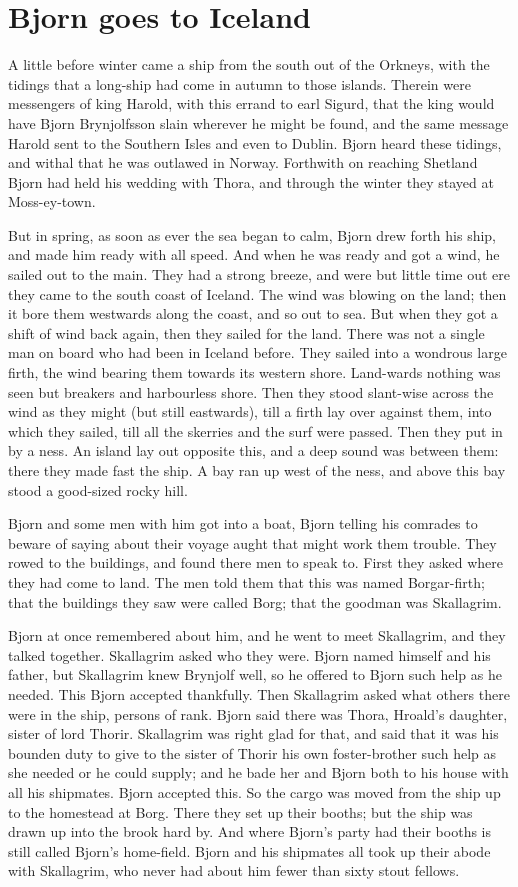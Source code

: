 \chapter{Bjorn goes to Iceland}
A little before winter came a ship from the south out of the Orkneys, with the tidings that a long-ship had come in autumn to those islands. Therein were messengers of king Harold, with this errand to earl Sigurd, that the king would have Bjorn Brynjolfsson slain wherever he might be found, and the same message Harold sent to the Southern Isles and even to Dublin. Bjorn heard these tidings, and withal that he was outlawed in Norway. Forthwith on reaching Shetland Bjorn had held his wedding with Thora, and through the winter they stayed at Moss-ey-town.

But in spring, as soon as ever the sea began to calm, Bjorn drew forth his ship, and made him ready with all speed. And when he was ready and got a wind, he sailed out to the main. They had a strong breeze, and were but little time out ere they came to the south coast of Iceland. The wind was blowing on the land; then it bore them westwards along the coast, and so out to sea. But when they got a shift of wind back again, then they sailed for the land. There was not a single man on board who had been in Iceland before. They sailed into a wondrous large firth, the wind bearing them towards its western shore. Land-wards nothing was seen but breakers and harbourless shore. Then they stood slant-wise across the wind as they might (but still eastwards), till a firth lay over against them, into which they sailed, till all the skerries and the surf were passed. Then they put in by a ness. An island lay out opposite this, and a deep sound was between them: there they made fast the ship. A bay ran up west of the ness, and above this bay stood a good-sized rocky hill.

Bjorn and some men with him got into a boat, Bjorn telling his comrades to beware of saying about their voyage aught that might work them trouble. They rowed to the buildings, and found there men to speak to. First they asked where they had come to land. The men told them that this was named Borgar-firth; that the buildings they saw were called Borg; that the goodman was Skallagrim.

Bjorn at once remembered about him, and he went to meet Skallagrim, and they talked together. Skallagrim asked who they were. Bjorn named himself and his father, but Skallagrim knew Brynjolf well, so he offered to Bjorn such help as he needed. This Bjorn accepted thankfully. Then Skallagrim asked what others there were in the ship, persons of rank. Bjorn said there was Thora, Hroald's daughter, sister of lord Thorir. Skallagrim was right glad for that, and said that it was his bounden duty to give to the sister of Thorir his own foster-brother such help as she needed or he could supply; and he bade her and Bjorn both to his house with all his shipmates. Bjorn accepted this. So the cargo was moved from the ship up to the homestead at Borg. There they set up their booths; but the ship was drawn up into the brook hard by. And where Bjorn's party had their booths is still called Bjorn's home-field. Bjorn and his shipmates all took up their abode with Skallagrim, who never had about him fewer than sixty stout fellows.

